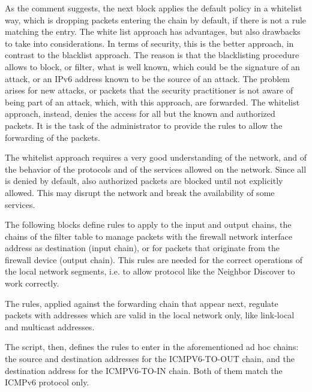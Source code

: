 \documentclass[12pt]{article}
\begin{document}
As the comment suggests, the next block applies the default policy in a whitelist way, which is dropping packets entering the chain by default, if there is not a rule matching the entry. The white list approach has advantages, but also drawbacks to take into considerations. In terms of security, this is the better approach, in contrast to the blacklist approach. The reason is that the blacklisting procedure allows to block, or filter, what is well known, which could be the signature of an attack, or an IPv6 address known to be the source of an attack. The problem arises for new attacks, or packets that the security practitioner is not aware of being part of an attack, which, with this approach, are forwarded. The whitelist approach, instead, denies the access for all but the known and authorized packets. It is the task of the administrator to provide the rules to allow the forwarding of the packets.

The whitelist approach requires a very good understanding of the network, and of the behavior of the protocols and of the services allowed on the network. Since all is denied by default, also authorized packets are blocked until not explicitly allowed. This may disrupt the network and break the availability of some services.

The following blocks define rules to apply to the input and output chains, the chains of the filter table to manage packets with the firewall network interface address as destination (input chain), or for packets that originate from the firewall device (output chain). This rules are needed for the correct operations of the local network segments, i.e. to allow protocol like the Neighbor Discover to work correctly.

The rules, applied against the forwarding chain that appear next, regulate packets with addresses which are valid in the local network only, like link-local and multicast addresses.

The script, then, defines the rules to enter in the aforementioned ad hoc chains: the source and destination addresses for the ICMPV6-TO-OUT chain, and the destination address for the ICMPV6-TO-IN chain. Both of them match the ICMPv6 protocol only.
\end{document}
